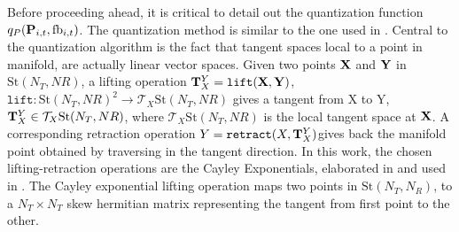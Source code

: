 \documentclass[conference]{IEEEtran}
\begin{document}
Before proceeding ahead, it is critical to detail out the quantization function $q_P({\bf P}_{i,t},\text{fb}_{i,t})$. 
The quantization method is similar to the one used in \cite{6891198,Gupt1905:Predictive,6545375}. 
Central to the quantization algorithm is the fact that tangent spaces local to a point in manifold, are actually linear vector spaces.
Given two points ${\bf X}$ and ${\bf Y}$ in $\text{St}(N_T,NR)$, a lifting operation ${\bf T}^Y_X=\texttt{lift}({\bf X},{\bf Y})$, $\texttt{lift}:\text{St}(N_T,NR)^2 \to \mathcal{T}_X \text{St}(N_T,NR)$ gives a tangent from X to Y, ${\bf T}^Y_X \in \mathcal{T}_X \text{St}(N_T,NR)$, where $\mathcal{T}_X \text{St}(N_T,NR)$ is the local tangent space at ${\bf X}$.
A corresponding retraction operation $Y=\texttt{retract}(X,{\bf T}^Y_X)$gives back the manifold point obtained by traversing in the tangent direction.
In this work, the chosen lifting-retraction operations are the Cayley Exponentials, elaborated in \cite{DBLP:journals/corr/abs-1708-00045} and used in \cite{Gupt1905:Predictive}.
The Cayley exponential lifting operation maps two points in $\text{St}(N_T,N_R)$, to a $N_T\times N_T$ skew hermitian matrix representing the tangent from first point to the other. 
\end{document}
